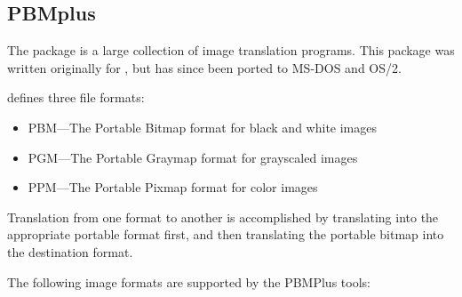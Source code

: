 
\subsection{PBMplus}

  The  package is a large collection of image translation
  programs.  This package was written originally for \Unix,
  but has since been ported to MS-DOS and OS/2.

   defines three file formats:
  
  \begin{itemize}
    \item PBM---The Portable Bitmap format for black and white images

    \item PGM---The Portable Graymap format for grayscaled images

    \item PPM---The Portable Pixmap format for color images
  \end{itemize}

  Translation from one format to another is accomplished by translating
  into the appropriate portable format first, and then translating the
  portable bitmap into the destination format.

  The following image formats are supported by the PBMPlus tools: 

